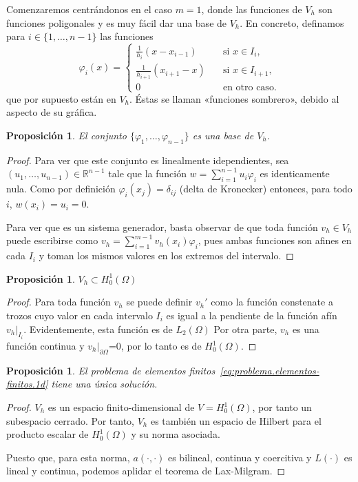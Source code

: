 \documentclass[11pt]{report}
\theoremstyle{plain}
\newtheorem{proposition}[theorem]{Proposición}
\theoremstyle{definition}
\newcommand{\R}{\ensuremath{\mathbb{R}}}
\begin{document}
Comenzaremos centrándonos en el caso  $m=1$, donde las funciones de $V_h$ son funciones poligonales y es muy fácil dar una base de $V_h$. 
En concreto, definamos para $i\in\{1,\dots,n-1\}$ las funciones
\[
  \varphi_i(x) = \left\{
    \begin{aligned}
      \frac 1{h_{i}} (x-x_{i-1}) &\quad \text{si } x\in I_{i},
      \\
      \frac 1{h_{i+1}} (x_{i+1}-x) &\quad \text{si } x\in I_{i+1},
      \\
      0 &\quad \text{en otro caso.}
    \end{aligned}
    \right.
\]
que por supuesto están en $V_h$. Éstas se llaman «funciones sombrero», debido al aspecto de su gráfica.

\begin{proposition}
El conjunto $\{\varphi_1,\dots,\varphi_{n-1}\} $ es una base de $V_h$.
\end{proposition}

\begin{proof}
  Para ver que este conjunto es linealmente idependientes, sea $(u_1,\dots,u_{n-1})\in\R^{n-1}$ tale que la función $w=\sum_{i=1}^{n-1} u_i \varphi_i$ es identicamente nula. Como por definición $\varphi_i(x_j)=\delta_{ij}$ (delta de Kronecker) entonces, para todo $i$, $w(x_i)=u_i=0$. 

  Para ver que es un sistema generador, basta observar de que toda función $v_h\in V_h$ puede escribirse como $v_h=\sum_{i=1}^{m-1} v_h(x_i)\varphi_i$, pues ambas funciones son afines en cada $I_i$ y toman los mismos valores en los extremos del intervalo.
\end{proof}

\begin{proposition}
$V_h\subset H_0^1(\Omega)$
\end{proposition}
\begin{proof}
  Para toda función $v_h$ se puede definir $v_h'$ como la función constenate a trozos cuyo valor en cada intervalo $I_i$ es igual a la pendiente de la función afín $v_h |_{I_i}$. Evidentemente, esta función es de $L_2(\Omega)$
  Por otra parte, $v_h$ es una función continua y $v_h|_{\partial\Omega}$=0, por lo tanto es de $H_0^1(\Omega)$. 
\end{proof}

\begin{proposition}
El problema de elementos finitos~\eqref{eq:problema.elementos-finitos.1d} tiene una única solución.
\end{proposition}
\begin{proof}
  $V_h$ es un espacio finito-dimensional de $V=H_0^1(\Omega)$, por tanto un subespacio cerrado. Por tanto, $V_h$ es también un espacio de Hilbert para el producto escalar de $H_0^1(\Omega)$ y su norma asociada.

Puesto que, para esta norma, $a(\cdot,\cdot)$ es bilineal, continua y coercitiva y $L(\cdot)$ es lineal y continua, podemos aplidar el teorema de Lax-Milgram.
\end{proof}
\end{document}
